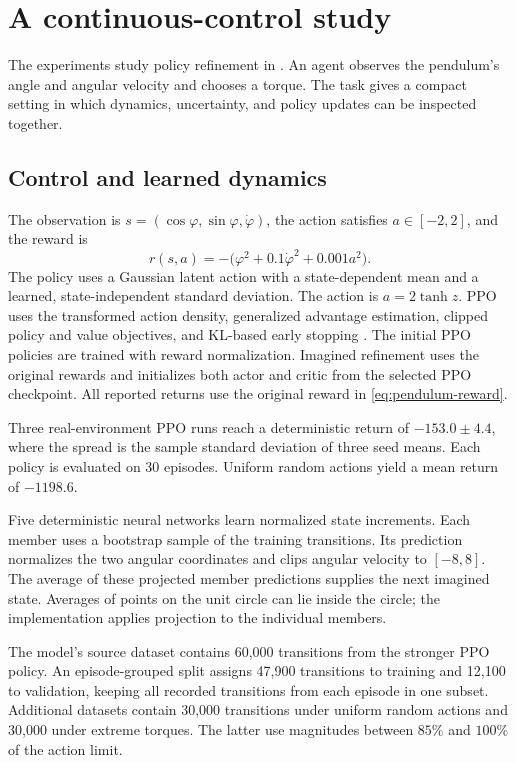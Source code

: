 \section{A continuous-control study}
\label{sec:experiments}

The experiments study policy refinement in . An agent observes the pendulum's angle and angular velocity and chooses a torque. The task gives a compact setting in which dynamics, uncertainty, and policy updates can be inspected together.

\subsection{Control and learned dynamics}

The observation is $s=(\cos\varphi,\sin\varphi,\dot\varphi)$, the action satisfies $a\in[-2,2]$, and the reward is
\begin{equation}
r(s,a)=-\bigl(\varphi^2+0.1\dot\varphi^2+0.001a^2\bigr).
\label{eq:pendulum-reward}
\end{equation}
The policy uses a Gaussian latent action with a state-dependent mean and a learned, state-independent standard deviation. The action is $a=2\tanh z$. PPO uses the transformed action density, generalized advantage estimation, clipped policy and value objectives, and KL-based early stopping \cite{ppo,gae}. The initial PPO policies are trained with reward normalization. Imagined refinement uses the original rewards and initializes both actor and critic from the selected PPO checkpoint. All reported returns use the original reward in \eqref{eq:pendulum-reward}.

Three real-environment PPO runs reach a deterministic return of $-153.0\pm4.4$, where the spread is the sample standard deviation of three seed means. Each policy is evaluated on 30 episodes. Uniform random actions yield a mean return of $-1198.6$.

Five deterministic neural networks learn normalized state increments. Each member uses a bootstrap sample of the training transitions. Its prediction normalizes the two angular coordinates and clips angular velocity to $[-8,8]$. The average of these projected member predictions supplies the next imagined state. Averages of points on the unit circle can lie inside the circle; the implementation applies projection to the individual members.

The model's source dataset contains 60,000 transitions from the stronger PPO policy. An episode-grouped split assigns 47,900 transitions to training and 12,100 to validation, keeping all recorded transitions from each episode in one subset. Additional datasets contain 30,000 transitions under uniform random actions and 30,000 under extreme torques. The latter use magnitudes between $85\%$ and $100\%$ of the action limit.

